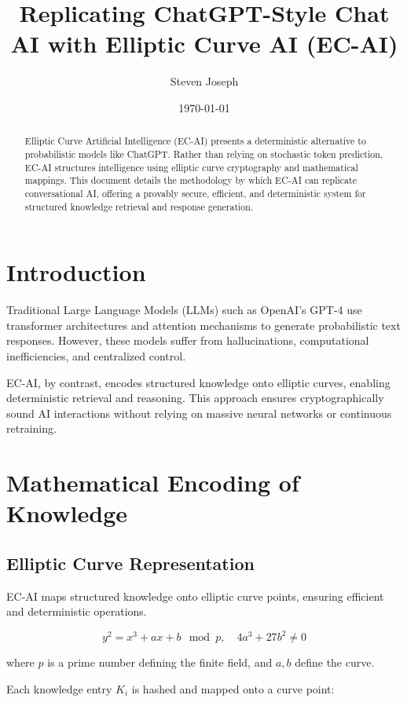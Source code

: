 \documentclass{article}
\title{Replicating ChatGPT-Style Chat AI with Elliptic Curve AI (EC-AI)}
\author{Steven Joseph}
\date{\today}
\begin{document}
\maketitle

\begin{abstract}
Elliptic Curve Artificial Intelligence (EC-AI) presents a deterministic alternative to probabilistic models like ChatGPT. 
Rather than relying on stochastic token prediction, EC-AI structures intelligence using elliptic curve cryptography and mathematical mappings. 
This document details the methodology by which EC-AI can replicate conversational AI, offering a provably secure, efficient, and deterministic system for structured knowledge retrieval and response generation.
\end{abstract}

\section{Introduction}
Traditional Large Language Models (LLMs) such as OpenAI's GPT-4 use transformer architectures and attention mechanisms to generate probabilistic text responses.
However, these models suffer from hallucinations, computational inefficiencies, and centralized control.

EC-AI, by contrast, encodes structured knowledge onto elliptic curves, enabling deterministic retrieval and reasoning.
This approach ensures cryptographically sound AI interactions without relying on massive neural networks or continuous retraining.

\section{Mathematical Encoding of Knowledge}

\subsection{Elliptic Curve Representation}
EC-AI maps structured knowledge onto elliptic curve points, ensuring efficient and deterministic operations.

\begin{equation}
y^2 = x^3 + ax + b \mod p, \quad 4a^3 + 27b^2 \neq 0
\end{equation}

where $p$ is a prime number defining the finite field, and $a, b$ define the curve.

Each knowledge entry $K_i$ is hashed and mapped onto a curve point:
\end{document}
